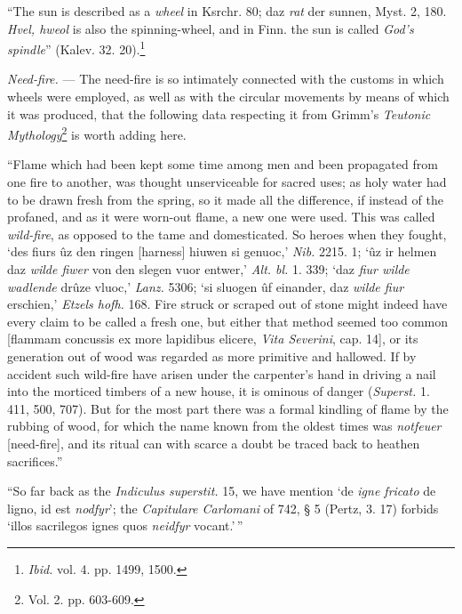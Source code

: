 \documentclass[a4paper, 11pt, oneside, polutonikogreek, english]{article}
\begin{document}
``The sun is described as a \emph{wheel} in Ksrchr. 80; daz \emph{rat} der sunnen, Myst. 2, 180. \emph{Hvel, hweol} is also the spinning-wheel, and in Finn. the sun is called \emph{God's spindle}'' (Kalev. 32. 20).\footnote{\emph{Ibid.} vol. 4. pp. 1499, 1500.}

\emph{Need-fire.} --- The need-fire is so intimately connected with the customs in which wheels were employed, as well as with the circular movements by means of which it was produced, that the following data respecting it from Grimm's \emph{Teutonic Mythology}\footnote{Vol. 2. pp. 603-609.} is worth adding here.

``Flame which had been kept some time among men and been propagated from one fire to another, was thought unserviceable for sacred uses; as holy water had to be drawn fresh from the spring, so it made all the difference, if instead of the profaned, and as it were worn-out flame, a new one were used. This was called \emph{wild-fire}, as opposed to the tame and domesticated. So heroes when they fought, `des fiurs ûz den ringen [harness] hiuwen si genuoc,' \emph{Nib.} 2215. 1; `ûz ir helmen daz \emph{wilde fiwer} von den slegen vuor entwer,' \emph{Alt. bl.} 1. 339; `daz \emph{fiur wilde wadlende} drûze vluoc,' \emph{Lanz.} 5306; `si sluogen ûf einander, daz \emph{wilde fiur} erschien,' \emph{Etzels hofh.} 168. Fire struck or scraped out of stone might indeed have every claim to be called a fresh one, but either that method seemed too common [flammam concussis ex more lapidibus elicere, \emph{Vita Severini}, cap. 14], or its generation out of wood was regarded as more primitive and hallowed. If by accident such wild-fire have arisen under the carpenter's hand in driving a nail into the morticed timbers of a new house, it is ominous of danger (\emph{Superst.} 1. 411, 500, 707). But for the most part there was a formal kindling of flame by the rubbing of wood, for which the name known from the oldest times was \emph{notfeuer} [need-fire], and its ritual can with scarce a doubt be traced back to heathen sacrifices.''

``So far back as the \emph{Indiculus superstit.} 15, we have mention `de \emph{igne fricato} de ligno, id est \emph{nodfyr}'; the \emph{Capitulare Carlomani} of 742, § 5 (Pertz, 3. 17) forbids `illos sacrilegos ignes quos \emph{neidfyr} vocant.'\,''
\end{document}
